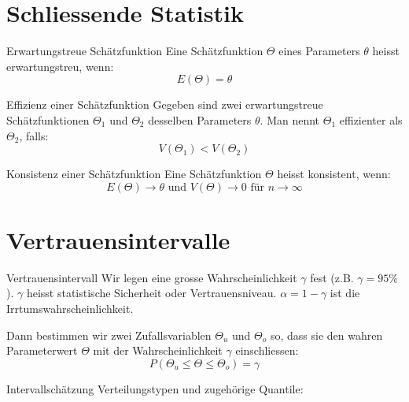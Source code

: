 \section{Schliessende Statistik}
\begin{definition}{Erwartungstreue Schätzfunktion}
Eine Schätzfunktion $\Theta$ eines Parameters $\theta$ heisst erwartungstreu, wenn:
$$
E(\Theta)=\theta
$$
\end{definition}

\begin{definition}{Effizienz einer Schätzfunktion}
Gegeben sind zwei erwartungstreue Schätzfunktionen $\Theta_1$ und $\Theta_2$ desselben Parameters $\theta$. Man nennt $\Theta_1$ effizienter als $\Theta_2$, falls:
$$
V(\Theta_1)<V(\Theta_2)
$$
\end{definition}

\begin{definition}{Konsistenz einer Schätzfunktion}
Eine Schätzfunktion $\Theta$ heisst konsistent, wenn:
$$
E(\Theta) \rightarrow \theta \text{ und } V(\Theta) \rightarrow 0 \text{ für } n \rightarrow \infty
$$
\end{definition}

\section{Vertrauensintervalle}
\begin{definition}{Vertrauensintervall}
Wir legen eine grosse Wahrscheinlichkeit $\gamma$ fest (z.B. $\gamma=95\%$). $\gamma$ heisst statistische Sicherheit oder Vertrauensniveau. $\alpha=1-\gamma$ ist die Irrtumswahrscheinlichkeit.

Dann bestimmen wir zwei Zufallsvariablen $\Theta_u$ und $\Theta_o$ so, dass sie den wahren Parameterwert $\Theta$ mit der Wahrscheinlichkeit $\gamma$ einschliessen:
$$
P(\Theta_u \leq \Theta \leq \Theta_o)=\gamma
$$
\end{definition}

\begin{concept}{Intervallschätzung}
Verteilungstypen und zugehörige Quantile:
\begin{center}
\end{center}
\end{concept}

